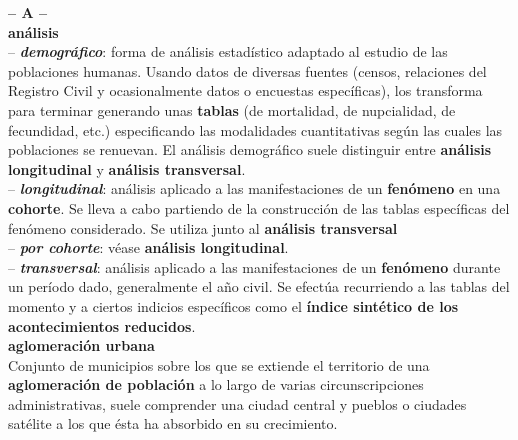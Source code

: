 \begin{multicols}{2}

\noindent\textbf{\huge{-- A --}}\\

\noindent \textbf{\Large{an\'alisis}}\\

\vspace{-0.3cm}
-- \textbf{\textit{demogr\'afico}}: forma de an\'alisis estad\'istico adaptado al estudio de las poblaciones humanas. Usando datos de diversas fuentes (censos, relaciones del Registro Civil y ocasionalmente datos o encuestas espec\'ificas), los transforma para terminar generando unas \textbf{tablas} (de mortalidad, de nupcialidad, de fecundidad, etc.) especificando las modalidades cuantitativas seg\'un las cuales las poblaciones se renuevan. El an\'alisis demogr\'afico suele distinguir entre \textbf{an\'alisis longitudinal} y \textbf{an\'alisis transversal}.\\

\vspace{-0.3cm}
-- \textbf{\textit{longitudinal}}: an\'alisis aplicado a las manifestaciones de un \textbf{fen\'omeno} en una \textbf{cohorte}. Se lleva a cabo partiendo de la construcci\'on de las tablas espec\'ificas del fen\'omeno considerado. Se utiliza junto al \textbf{an\'alisis transversal}\\

\vspace{-0.3cm}
-- \textbf{\textit{por cohorte}}: v\'ease \textbf{an\'alisis longitudinal}.\\

\vspace{-0.3cm}
-- \textbf{\textit{transversal}}: an\'alisis aplicado a las manifestaciones de un \textbf{fen\'omeno} durante un per\'iodo dado, generalmente el a\~no civil. Se efect\'ua recurriendo a las tablas del momento y a ciertos indicios espec\'ificos  como el \textbf{\'indice sint\'etico de los acontecimientos reducidos}.\\

\noindent \textbf{\Large{aglomeración urbana}}\\

\vspace{-0.3cm}
Conjunto de municipios sobre los que se extiende el territorio de una \textbf{aglomeración de población} a lo largo de varias circunscripciones administrativas, suele comprender una ciudad central y pueblos o ciudades satélite a los que ésta ha absorbido en su crecimiento.\\


\end{multicols}
